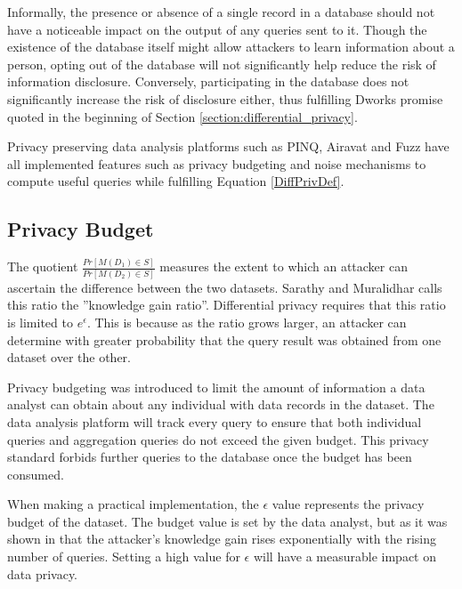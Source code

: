 Informally, the presence or absence of a single record in a database should not have a noticeable impact on the output of any queries sent to it. Though the existence of the database itself might allow attackers to learn information about a person, opting out of the database will not significantly help reduce the risk of information disclosure. Conversely, participating in the database does not significantly increase the risk of disclosure either, thus fulfilling Dworks promise quoted in the beginning of Section \ref{section:differential_privacy}.

Privacy preserving data analysis platforms such as PINQ\cite{mcsherry2009PINQ}, Airavat\cite{roy2010airavat} and Fuzz\cite{Haeberlen2011fuzz} have all implemented features such as privacy budgeting and noise mechanisms to compute useful queries while fulfilling Equation \ref{DiffPrivDef}.

\subsection{Privacy Budget}
\label{section:privacy_budget}
The quotient $\frac{Pr[M(D_1)\in S]}{Pr[M(D_2)\in S]}$ measures the extent to which an attacker can ascertain the difference between the two datasets\cite{abowd2008protective}. Sarathy and Muralidhar\cite{Sarathy2011evaluating} calls this ratio the ''knowledge gain ratio''. Differential privacy requires that this ratio is limited to $e^\epsilon$. This is because as the ratio grows larger, an attacker can determine with greater probability that the query result was obtained from one dataset over the other.

Privacy budgeting was introduced to limit the amount of information a data analyst can obtain about any individual with data records in the dataset. The data analysis platform will track every query to ensure that both individual queries and aggregation queries do not exceed the given budget. This privacy standard forbids further queries to the database once the budget has been consumed. 


When making a practical implementation, the $\epsilon$ value represents the privacy budget of the dataset. The budget value is set by the data analyst, but as it was shown in \cite{Sarathy2011evaluating} that the attacker's knowledge gain rises exponentially with the rising number of queries. Setting a high value for $\epsilon$ will have a measurable impact on data privacy. 


